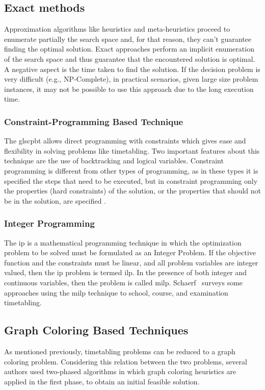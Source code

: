 \subsection{Exact methods}
\label{subsection:exactmethods}
Approximation algorithms like heuristics and meta-heuristics proceed to enumerate partially the search space and, for that reason, they can't guarantee finding the optimal solution. Exact approaches perform an implicit enumeration of the search space and thus guarantee that the encountered solution is optimal. A negative aspect is the time taken to find the solution. If the decision problem is very difficult (e.g., NP-Complete), in practical scenarios, given large size problem instances, it may not be possible to use this approach due to the long execution time.\\

\subsubsection{Constraint-Programming Based Technique}
The gls{cpbt} allows direct programming with constraints which gives ease and flexibility in solving problems like timetabling. Two important features about this technique are the use of backtracking and logical variables. Constraint programming is different from other types of programming, as in these types it is specified the steps that need to be executed, but in constraint programming only the properties (hard constraints) of the solution, or the properties that should not be in the solution, are specified \cite{Qu2009}.\\

\subsubsection{Integer Programming}
The \gls{ip} is a mathematical programming technique in which the optimization problem to be solved must be formulated as an Integer Problem. If the objective function and the constraints must be linear, and all problem variables are integer valued, then the \gls{ip} problem is termed \gls{ilp}. In the presence of both integer and continuous variables, then the problem is called \gls{milp}. Schaerf~\cite{Schaerf1999} surveys some approaches using the \gls{milp} technique to school, course, and examination timetabling.\\

\subsection{Graph Coloring Based Techniques}
\label{subsection:graphcoloring}
As mentioned previously, timetabling problems can be reduced to a graph coloring problem. Considering this relation between the two problems, several authors used two-phased algorithms in which graph coloring heuristics are applied in the first phase, to obtain an initial feasible solution.\\

